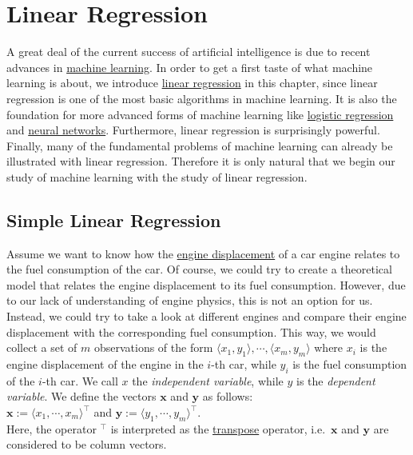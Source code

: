 \chapter{Linear Regression}
A great deal of the current success of artificial intelligence is due to recent advances in
\href{https://en.wikipedia.org/wiki/Machine_learning}{machine learning}.  
In order to get a first taste of what machine learning is about, we introduce 
\href{https://en.wikipedia.org/wiki/Linear_regression}{linear regression} in this chapter, since linear regression
is one of the most basic algorithms in machine learning.  It is also the foundation for more advanced
forms of machine learning like \href{https://en.wikipedia.org/wiki/Logistic_regression}{logistic regression} and 
\href{https://en.wikipedia.org/wiki/Artificial_neural_network}{neural networks}.
Furthermore, linear regression is surprisingly powerful.  Finally, many of the fundamental problems of machine
learning can already be illustrated with linear regression.  Therefore it is only natural that we begin our
study of machine learning with the study of linear regression.

\section{Simple Linear Regression}
Assume we want to know how the \href{https://en.wikipedia.org/wiki/Engine_displacement}{engine displacement} of
a car engine relates to the fuel consumption of the car.  Of course, we could try to create a theoretical model that
relates the engine displacement to its fuel consumption.  However, due to our lack of understanding of engine
physics, this is not an option for us.  Instead, we could try to take a look at different engines and compare
their engine displacement with the corresponding fuel consumption.  This way, we would collect a set of  
$m$ observations of the form $\langle x_1, y_1\rangle, \cdots, \langle x_m, y_m\rangle$ 
where $x_i$ is the engine displacement of the engine in the $i$-th car, while $y_i$ is the fuel consumption of the
$i$-th car.  We call $x$ the \emph{\color{blue}independent variable}, while $y$ is the 
\emph{\color{blue}dependent variable}.  We define the vectors $\mathbf{x}$ and $\mathbf{y}$ as follows:
\\[0.2cm]
\hspace*{1.3cm}
$\mathbf{x} := \langle x_1, \cdots, x_m \rangle^\top$ \quad and \quad
$\mathbf{y} := \langle y_1, \cdots, y_m \rangle^\top$.
\\[0.2cm]
Here, the operator $^\top$ is interpreted as the \href{https://en.wikipedia.org/wiki/Transpose}{transpose} operator,
i.e.~$\mathbf{x}$ and $\mathbf{y}$ are considered to be column vectors.

